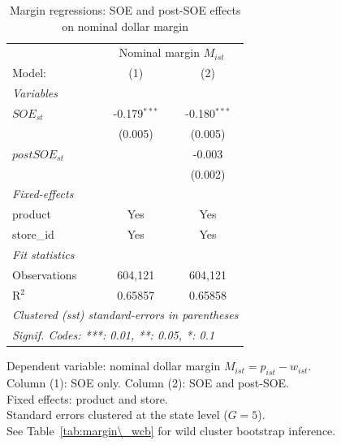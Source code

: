 
\begin{table}[htbp]
   \caption{\label{tab:margin_reg} Margin regressions: SOE and post-SOE effects on nominal dollar margin}
   \centering
   \begin{tabular}{lcc}
      \tabularnewline \midrule \midrule
       & \multicolumn{2}{c}{Nominal margin $M_{ist}$} \\ 
      Model:         & (1)            & (2)\\  
      \midrule
      \emph{Variables}\\
      $SOE_{st}$     & -0.179$^{***}$ & -0.180$^{***}$\\   
                     & (0.005)        & (0.005)\\   
      $postSOE_{st}$ &                & -0.003\\   
                     &                & (0.002)\\   
      \midrule
      \emph{Fixed-effects}\\
      product        & Yes            & Yes\\  
      store\_id      & Yes            & Yes\\  
      \midrule
      \emph{Fit statistics}\\
      Observations   & 604,121        & 604,121\\  
      R$^2$          & 0.65857        & 0.65858\\  
      \midrule \midrule
      \multicolumn{3}{l}{\emph{Clustered (sst) standard-errors in parentheses}}\\
      \multicolumn{3}{l}{\emph{Signif. Codes: ***: 0.01, **: 0.05, *: 0.1}}\\
   \end{tabular}
   
   \par \raggedright 
   Dependent variable: nominal dollar margin $M_{ist} = p_{ist} - w_{ist}$.\\
   Column (1): SOE only. Column (2): SOE and post-SOE.\\
   Fixed effects: product and store.\\
   Standard errors clustered at the state level ($G = 5$).\\
   See Table~\ref{tab:margin\_wcb} for wild cluster bootstrap inference.
\end{table}


